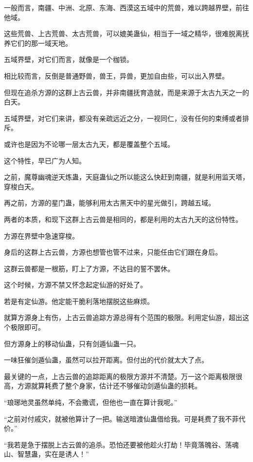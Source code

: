 
\begin{this_body}

一般而言，南疆、中洲、北原、东海、西漠这五域中的荒兽，难以跨越界壁，前往他域。

这些荒兽、上古荒兽、太古荒兽，可以媲美蛊仙，相当于一域之精华，很难脱离抚养它们的那一域天地。

五域界壁，对它们而言，就像是一个枷锁。

相比较而言，反倒是普通野兽，兽王，异兽，更加自由些，可以出入界壁。

但现在追杀方源的这群上古云兽，并非南疆抚育造就，而是来源于太古九天之一的白天。

五域界壁，对它们来讲，都没有亲疏远近之分，一视同仁，没有任何的束缚或者排斥。

或许也是因为不论哪一层太古九天，都是覆盖整个五域。

这个特性，早已广为人知。

之前，魔尊幽魂逆天炼蛊，天庭蛊仙之所以能这么快赶到南疆，就是利用监天塔，穿梭白天。

再之前，方源的星门蛊，能够利用太古黑天中的星光做引，跨越五域。

两者的本质，和现下这群上古云兽是相同的，都是利用的太古九天的这份特性。

方源在界壁中急速穿梭。

身后的这群上古云兽，方源也想管也管不过来，只能任由它们跟在身后。

这群云兽都是一根筋，盯上了方源，不达目的誓不罢休。

这个时候，方源不禁又怀念起定仙游的好处了。

若是有定仙游。他定能干脆利落地摆脱这些麻烦。

就算方源身上有伤，上古云兽追踪方源总得有个范围的极限。利用定仙游，超出这个极限即可。

但方源身上的移动仙蛊，只有剑遁仙蛊一只。

一味狂催剑遁仙蛊，虽然可以拉开距离。但付出的代价就太大了点。

最关键的一点，上古云兽的追踪距离的极限方源并不清楚。万一这个距离极限很高，方源就算耗费了整个身家，估计还不够催动剑遁仙蛊的损耗。

“琅琊地灵虽然单纯，不会撒谎，但他也一直在算计我呢。”

“之前对付戚灾，就被他算计了一把。输送暗渡仙蛊借给我。可是耗费了我不菲代价。”

“我若是急于摆脱上古云兽的追杀。恐怕还要被他趁火打劫！毕竟落魄谷、荡魂山、智慧蛊，实在是诱人！”


\end{this_body}
